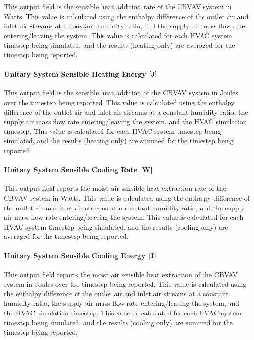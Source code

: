This output field is the sensible heat addition rate of the CBVAV system in Watts. This value is calculated using the enthalpy difference of the outlet air and inlet air streams at a constant humidity ratio, and the supply air mass flow rate entering/leaving the system. This value is calculated for each HVAC system timestep being simulated, and the results (heating only) are averaged for the timestep being reported.

\paragraph{Unitary System Sensible Heating Energy {[}J{]}}\label{unitary-system-sensible-heating-energy-j}

This output field is the sensible heat addition of the CBVAV system in Joules over the timestep being reported. This value is calculated using the enthalpy difference of the outlet air and inlet air streams at a constant humidity ratio, the supply air mass flow rate entering/leaving the system, and the HVAC simulation timestep. This value is calculated for each HVAC system timestep being simulated, and the results (heating only) are summed for the timestep being reported.

\paragraph{Unitary System Sensible Cooling Rate {[}W{]}}\label{unitary-system-sensible-cooling-rate-w-2}

This output field reports the moist air sensible heat extraction rate of the CBVAV system in Watts. This value is calculated using the enthalpy difference of the outlet air and inlet air streams at a constant humidity ratio, and the supply air mass flow rate entering/leaving the system. This value is calculated for each HVAC system timestep being simulated, and the results (cooling only) are averaged for the timestep being reported.

\paragraph{Unitary System Sensible Cooling Energy {[}J{]}}\label{unitary-system-sensible-cooling-energy-j}

This output field reports the moist air sensible heat extraction of the CBVAV system in Joules over the timestep being reported. This value is calculated using the enthalpy difference of the outlet air and inlet air streams at a constant humidity ratio, the supply air mass flow rate entering/leaving the system, and the HVAC simulation timestep. This value is calculated for each HVAC system timestep being simulated, and the results (cooling only) are summed for the timestep being reported.

